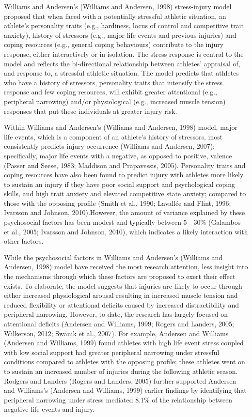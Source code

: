 \documentclass[
  english,
  man,floatsintext]{apa6}
\begin{document}
Williams and Andersen's (Williams and Andersen, 1998) stress-injury model proposed that when faced with a potentially stressful athletic situation, an athlete's personality traits (e.g., hardiness, locus of control and competitive trait anxiety), history of stressors (e.g., major life events and previous injuries) and coping resources (e.g., general coping behaviours) contribute to the injury response, either interactively or in isolation. The stress response is central to the model and reflects the bi-directional relationship between athletes' appraisal of, and response to, a stressful athletic situation. The model predicts that athletes who have a history of stressors, personality traits that intensify the stress response and few coping resources, will exhibit greater attentional (e.g., peripheral narrowing) and/or physiological (e.g., increased muscle tension) responses that put these individuals at greater injury risk.

Within Williams and Andersen's (Williams and Andersen, 1998) model, major life events, which is a component of an athlete's history of stressors, most consistently predicts injury occurrence (Williams and Andersen, 2007); specifically, major life events with a negative, as opposed to positive, valence (Passer and Seese, 1983; Maddison and Prapavessis, 2005). Personality traits and coping resources have also been found to predict injury with athletes more likely to sustain an injury if they have poor social support and psychological coping skills, and high trait anxiety and elevated competitive state anxiety; compared to those with the opposing profile (Smith et al., 1990; Lavallée and Flint, 1996; Ivarsson and Johnson, 2010).However, the amount of variance explained by these psychosocial factors has been modest and typically between 5 - 30\% (Galambos et al., 2005; Ivarsson and Johnson, 2010), which indicates a likely interaction with other factors.

While the psychosocial factors in Williams and Andersen's (Williams and Andersen, 1998) model have received the most research attention, less insight into the mechanisms through which these factors are proposed to exert their effect exists. To elaborate, the model suggests that injuries are likely to occur through either increased physiological arousal resulting in increased muscle tension and reduced flexibility or attentional deficits caused by increased distractibility and peripheral narrowing. However, to date, the research has largely focused on attentional deficits (Andersen and Williams, 1999; Rogers and Landers, 2005; Wilkerson, 2012; Swanik et al., 2007). For example, Andersen and Williams (Andersen and Williams, 1999) found athletes with high life event stress coupled with low social support had greater peripheral narrowing under stressful conditions compared to athletes with the opposing profile; these athletes went on to sustain an increased number of injuries during the following athletic season. Rodgers and Landers (Rogers and Landers, 2005) further supported Andersen and Williams's (Andersen and Williams, 1999) earlier findings by identifying that peripheral narrowing under stress mediated 8.1\% of the relationship between negative life events and injury.
\end{document}
